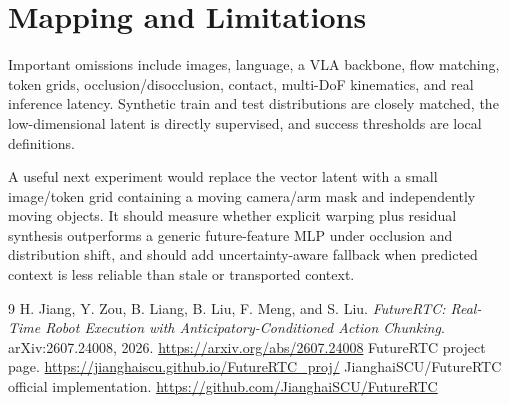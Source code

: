 \documentclass[11pt]{article}
\begin{document}
\section{Mapping and Limitations}

\begin{table}[H]
\centering
{}
\caption{Mechanism mapping.}
\label{tab:mapping}
\end{table}

Important omissions include images, language, a VLA backbone, flow matching, token grids, occlusion/disocclusion, contact, multi-DoF kinematics, and real inference latency. Synthetic train and test distributions are closely matched, the low-dimensional latent is directly supervised, and success thresholds are local definitions.

A useful next experiment would replace the vector latent with a small image/token grid containing a moving camera/arm mask and independently moving objects. It should measure whether explicit warping plus residual synthesis outperforms a generic future-feature MLP under occlusion and distribution shift, and should add uncertainty-aware fallback when predicted context is less reliable than stale or transported context.

\begin{thebibliography}{9}
 H. Jiang, Y. Zou, B. Liang, B. Liu, F. Meng, and S. Liu. \emph{FutureRTC: Real-Time Robot Execution with Anticipatory-Conditioned Action Chunking}. arXiv:2607.24008, 2026. \url{https://arxiv.org/abs/2607.24008}
 FutureRTC project page. \url{https://jianghaiscu.github.io/FutureRTC_proj/}
 JianghaiSCU/FutureRTC official implementation. \url{https://github.com/JianghaiSCU/FutureRTC}
\end{thebibliography}
\end{document}
